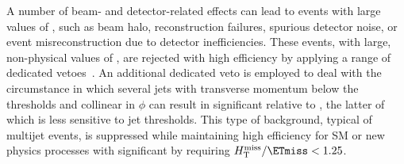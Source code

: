 A number of beam- and detector-related effects can lead to events with
large values of \ETmiss, such as beam halo, reconstruction failures,
spurious detector noise, or event misreconstruction due to detector
inefficiencies. These events, with large, non-physical values of
\ETmiss, are rejected with high efficiency by applying a range of
dedicated vetoes~\cite{RA1Paper2012, cms-met}. An additional dedicated
veto is employed to deal with the circumstance in which several jets
with transverse momentum below the \Pt thresholds and collinear in
$\phi$ can result in significant \mht relative to \ETmiss, the latter
of which is less sensitive to jet thresholds. This type of background,
typical of multijet events, is suppressed while maintaining high
efficiency for SM or new physics processes with significant \ptvecmiss
by requiring $\mht / \ETmiss < 1.25$.

